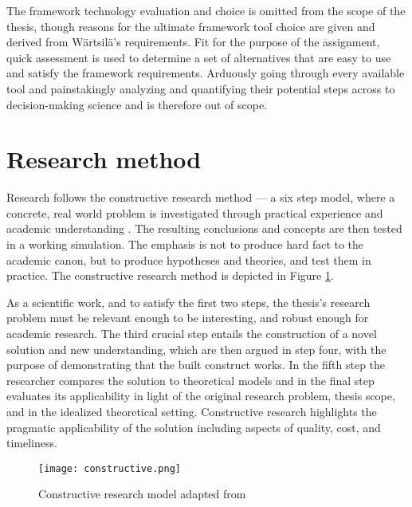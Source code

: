 \documentclass[12pt,a4paper,oneside,pdftex]{report}
\begin{document}
The framework technology evaluation and choice is omitted from the scope of the thesis, though reasons for the ultimate framework tool choice are given and derived from Wärtsilä's requirements. Fit for the purpose of the assignment, quick assessment is used to determine a set of alternatives that are easy to use and satisfy the framework requirements. Arduously going through every available tool and painstakingly analyzing and quantifying their potential steps across to decision-making science and is therefore out of scope. 


\section{Research method}
Research follows the constructive research method --- a six step model, where a concrete, real world problem is investigated through practical experience and academic understanding \citep{kasanen1993constructive, shaw2001research}. The resulting conclusions and concepts are then tested in a working simulation. The emphasis is not to produce hard fact to the academic canon, but to produce hypotheses and theories, and test them in practice. The constructive research method is depicted in Figure \ref{fig:constructiveResearch}.

As a scientific work, and to satisfy the first two steps, the thesis's research problem must be relevant enough to be interesting, and robust enough for academic research. The third crucial step entails the construction of a novel solution and new understanding, which are then argued in step four, with the purpose of demonstrating that the built construct works. In the fifth step the researcher compares the solution to theoretical models and in the final step evaluates its applicability in light of the original research problem, thesis scope, and in the idealized theoretical setting. Constructive research highlights the pragmatic applicability of the solution including aspects of quality, cost, and timeliness.

\begin{figure}[h]
  \begin{center}
    \texttt{[image: constructive.png]}
    \caption{Constructive research model adapted from \citet{kasanen1993constructive}}
    \label{fig:constructiveResearch}
  \end{center}
\end{figure}
\end{document}
